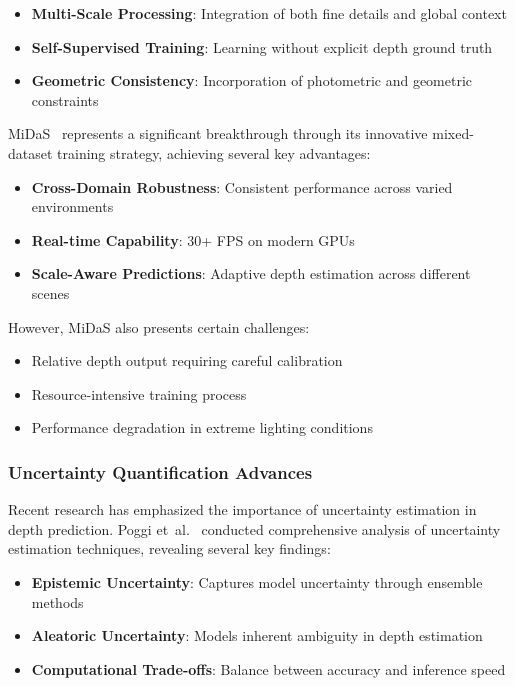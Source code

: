 \documentclass[12pt,oneside]{book}
\begin{document}
\begin{itemize}
    \item \textbf{Multi-Scale Processing}: Integration of both fine details and global context
    \item \textbf{Self-Supervised Training}: Learning without explicit depth ground truth
    \item \textbf{Geometric Consistency}: Incorporation of photometric and geometric constraints
\end{itemize}

MiDaS~\cite{ranftl2020towards} represents a significant breakthrough through its innovative mixed-dataset training strategy, achieving several key advantages:

\begin{itemize}
    \item \textbf{Cross-Domain Robustness}: Consistent performance across varied environments
    \item \textbf{Real-time Capability}: 30+ FPS on modern GPUs
    \item \textbf{Scale-Aware Predictions}: Adaptive depth estimation across different scenes
\end{itemize}

However, MiDaS also presents certain challenges:
\begin{itemize}
    \item Relative depth output requiring careful calibration
    \item Resource-intensive training process
    \item Performance degradation in extreme lighting conditions
\end{itemize}

\subsubsection{Uncertainty Quantification Advances}
Recent research has emphasized the importance of uncertainty estimation in depth prediction. Poggi et~al.~\cite{poggi2020uncertainty} conducted comprehensive analysis of uncertainty estimation techniques, revealing several key findings:

\begin{itemize}
    \item \textbf{Epistemic Uncertainty}: Captures model uncertainty through ensemble methods
    \item \textbf{Aleatoric Uncertainty}: Models inherent ambiguity in depth estimation
    \item \textbf{Computational Trade-offs}: Balance between accuracy and inference speed
\end{itemize}
\end{document}
